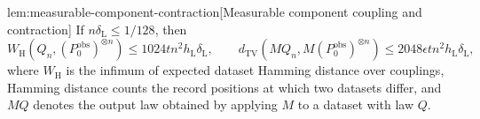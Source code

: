 \documentclass[11pt]{article}
\begin{document}
\begin{lemmav}{lem:measurable-component-contraction}[Measurable component coupling and contraction]
If \(n\delta_{\mathrm L}\le1/128\), then
\[
W_{\mathrm H}\!\left(Q_n,(P_0^{\mathrm{obs}})^{\otimes n}\right)
 \le1024tn^2h_{\mathrm L}\delta_{\mathrm L},
\qquad
d_{\mathrm{TV}}\!\left(MQ_n,M(P_0^{\mathrm{obs}})^{\otimes n}\right)
 \le2048\epsilon tn^2h_{\mathrm L}\delta_{\mathrm L},
\]
where \(W_{\mathrm H}\) is the infimum of expected dataset Hamming distance over couplings, Hamming distance counts the record positions at which two datasets differ, and \(MQ\) denotes the output law obtained by applying \(M\) to a dataset with law \(Q\).
\end{lemmav}
\end{document}
